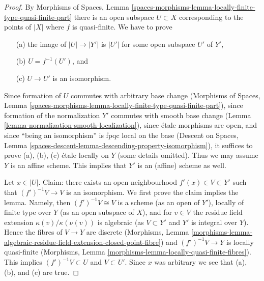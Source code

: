 \begin{proof}
By Morphisms of Spaces, Lemma
\ref{spaces-morphisms-lemma-locally-finite-type-quasi-finite-part}
there is an open subspace $U \subset X$ corresponding to the points
of $|X|$ where $f$ is quasi-finite. We have to prove
\begin{enumerate}
\item[(a)] the image of $|U| \to |Y'|$ is $|U'|$ for some open subspace
$U'$ of $Y'$,
\item[(b)] $U = f^{-1}(U')$, and
\item[(c)] $U \to U'$ is an isomorphism.
\end{enumerate}
Since formation of $U$ commutes with arbitrary base change
(Morphisms of Spaces, Lemma
\ref{spaces-morphisms-lemma-locally-finite-type-quasi-finite-part}),
since formation of the normalization $Y'$ commutes with smooth
base change (Lemma \ref{lemma-normalization-smooth-localization}),
since \'etale morphisms are open, and
since ``being an isomorphism'' is fpqc local on the base
(Descent on Spaces, Lemma
\ref{spaces-descent-lemma-descending-property-isomorphism}),
it suffices to prove (a), (b), (c) \'etale locally on $Y$
(some details omitted). Thus
we may assume $Y$ is an affine scheme. This implies that $Y'$ is
an (affine) scheme as well.

\medskip\noindent
Let $x \in |U|$. Claim: there exists an open
neighbourhood $f'(x) \in V \subset Y'$ such that $(f')^{-1}V \to V$ is an
isomorphism. We first prove the claim implies the lemma.
Namely, then $(f')^{-1}V \cong V$ is a scheme (as an open
of $Y'$), locally of finite type over $Y$ (as an open subspace of $X$),
and for $v \in V$ the residue field extension
$\kappa(v)/\kappa(\nu(v))$ is algebraic (as
$V \subset Y'$ and $Y'$ is integral over $Y$). Hence the fibres
of $V \to Y$ are discrete (Morphisms, Lemma
\ref{morphisms-lemma-algebraic-residue-field-extension-closed-point-fibre})
and $(f')^{-1}V \to Y$ is locally quasi-finite
(Morphisms, Lemma \ref{morphisms-lemma-locally-quasi-finite-fibres}).
This implies $(f')^{-1}V \subset U$ and $V \subset U'$. Since $x$ was
arbitrary we see that (a), (b), and (c) are true.


\end{proof}
